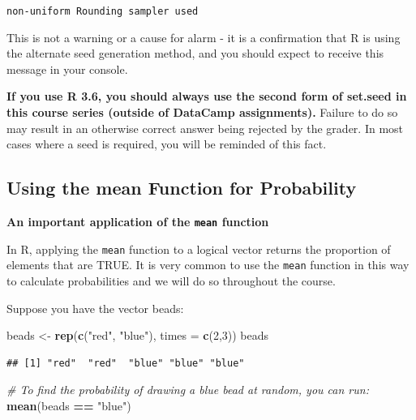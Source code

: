 \documentclass[
]{article}
\newenvironment{Shaded}{\begin{snugshade}}{\end{snugshade}}
\newcommand{\CommentTok}[1]{\textcolor[rgb]{0.56,0.35,0.01}{\textit{#1}}}
\newcommand{\DataTypeTok}[1]{\textcolor[rgb]{0.13,0.29,0.53}{#1}}
\newcommand{\DecValTok}[1]{\textcolor[rgb]{0.00,0.00,0.81}{#1}}
\newcommand{\KeywordTok}[1]{\textcolor[rgb]{0.13,0.29,0.53}{\textbf{#1}}}
\newcommand{\NormalTok}[1]{#1}
\newcommand{\OperatorTok}[1]{\textcolor[rgb]{0.81,0.36,0.00}{\textbf{#1}}}
\newcommand{\StringTok}[1]{\textcolor[rgb]{0.31,0.60,0.02}{#1}}
\begin{document}
\texttt{non-uniform\ \textquotesingle{}Rounding\textquotesingle{}\ sampler\ used}

This is not a warning or a cause for alarm - it is a confirmation that R
is using the alternate seed generation method, and you should expect to
receive this message in your console.

\textbf{If you use R 3.6, you should always use the second form of
set.seed in this course series (outside of DataCamp assignments).}
Failure to do so may result in an otherwise correct answer being
rejected by the grader. In most cases where a seed is required, you will
be reminded of this fact.

\hypertarget{using-the-mean-function-for-probability}{%
\subsection{Using the mean Function for
Probability}\label{using-the-mean-function-for-probability}}

\textbf{An important application of the \texttt{mean} function}

In R, applying the \texttt{mean} function to a logical vector returns
the proportion of elements that are TRUE. It is very common to use the
\texttt{mean} function in this way to calculate probabilities and we
will do so throughout the course.

Suppose you have the vector beads:

\begin{Shaded}
\begin{Highlighting}[]
\NormalTok{beads \textless{}{-}}\StringTok{ }\KeywordTok{rep}\NormalTok{(}\KeywordTok{c}\NormalTok{(}\StringTok{"red"}\NormalTok{, }\StringTok{"blue"}\NormalTok{), }\DataTypeTok{times =} \KeywordTok{c}\NormalTok{(}\DecValTok{2}\NormalTok{,}\DecValTok{3}\NormalTok{))}
\NormalTok{beads}
\end{Highlighting}
\end{Shaded}

\begin{verbatim}
## [1] "red"  "red"  "blue" "blue" "blue"
\end{verbatim}

\begin{Shaded}
\begin{Highlighting}[]
\CommentTok{\# To find the probability of drawing a blue bead at random, you can run:}
\KeywordTok{mean}\NormalTok{(beads }\OperatorTok{==}\StringTok{ "blue"}\NormalTok{)}
\end{Highlighting}
\end{Shaded}
\end{document}
